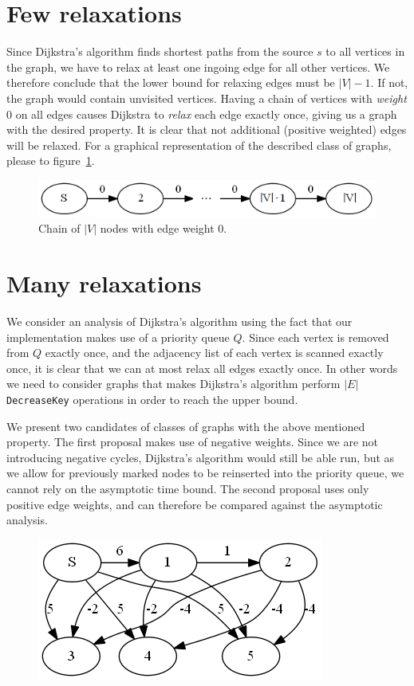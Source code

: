 \documentclass[a4paper,oneside,article,11pt]{memoir}
\begin{document}
\section{Few relaxations}
Since Dijkstra's algorithm finds shortest paths from the source $s$ to all vertices in the graph, we have to relax at least one ingoing edge for all other vertices. We therefore conclude that the lower bound for relaxing edges must be $\vert V \vert -1$. If not, the graph would contain unvisited vertices. Having a chain of vertices with \textit{weight} 0 on all edges causes Dijkstra to \textit{relax} each edge exactly once, giving us a graph with the desired property. It is clear that not additional (positive weighted) edges will be relaxed. For a graphical representation of the described class of graphs, please to figure~\ref{figure:graph_chain}.

\begin{figure}
\centering
\includegraphics[scale=1]{../figures/graph_chain.png}
\caption{Chain of $\vert V \vert$ nodes with edge weight 0.}
\label{figure:graph_chain}
\end{figure}

\section{Many relaxations}
We consider an analysis of Dijkstra's algorithm using the fact that our implementation makes use of a priority queue $Q$. Since each vertex is removed from $Q$ exactly once, and the adjacency list of each vertex is scanned exactly once, it is clear that we can at most relax all edges exactly once.
In other words we need to consider graphs that makes Dijkstra's algorithm perform $\vert E \vert$ \texttt{DecreaseKey} operations in order to reach the upper bound.

We present two candidates of classes of graphs with the above mentioned property. The first proposal makes use of negative weights. Since we are not introducing negative cycles, Dijkstra's algorithm would still be able run, but as we allow for previously marked nodes to be reinserted into the priority queue, we cannot rely on the asymptotic time bound. The second proposal uses only positive edge weights, and can therefore be compared against the asymptotic analysis.

\begin{figure}
\centering
\includegraphics[scale=0.8]{../figures/graph_neg_weights.png}
\caption{}
\label{figure:graph_neg_weights}
\end{figure}
\end{document}

